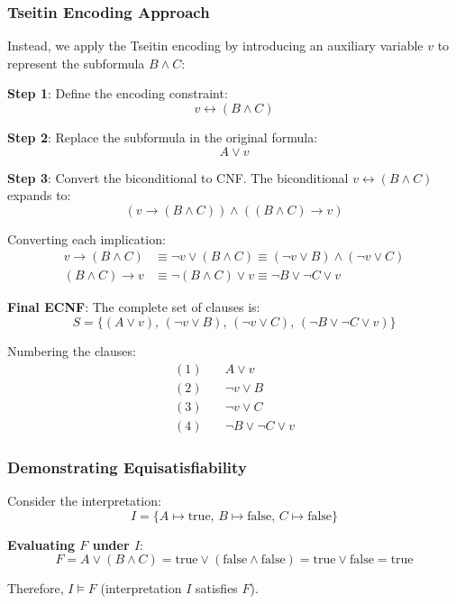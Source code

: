 \documentclass[11pt,a4paper]{article}
\theoremstyle{definition}
\theoremstyle{plain}
\theoremstyle{remark}
\begin{document}
\subsubsection{Tseitin Encoding Approach}

Instead, we apply the Tseitin encoding by introducing an auxiliary variable $v$ to represent the subformula $B \land C$:

\textbf{Step 1}: Define the encoding constraint:
\[
v \leftrightarrow (B \land C)
\]

\textbf{Step 2}: Replace the subformula in the original formula:
\[
A \lor v
\]

\textbf{Step 3}: Convert the biconditional to CNF. The biconditional $v \leftrightarrow (B \land C)$ expands to:
\[
(v \rightarrow (B \land C)) \land ((B \land C) \rightarrow v)
\]

Converting each implication:
\begin{align*}
v \rightarrow (B \land C) &\equiv \neg v \lor (B \land C) \equiv (\neg v \lor B) \land (\neg v \lor C) \\
(B \land C) \rightarrow v &\equiv \neg(B \land C) \lor v \equiv \neg B \lor \neg C \lor v
\end{align*}

\textbf{Final ECNF}: The complete set of clauses is:
\[
S = \{(A \lor v), \, (\neg v \lor B), \, (\neg v \lor C), \, (\neg B \lor \neg C \lor v)\}
\]

Numbering the clauses:
\begin{align*}
(1) &\quad A \lor v \\
(2) &\quad \neg v \lor B \\
(3) &\quad \neg v \lor C \\
(4) &\quad \neg B \lor \neg C \lor v
\end{align*}

\subsubsection{Demonstrating Equisatisfiability}

Consider the interpretation:
\[
I = \{A \mapsto \text{true}, \, B \mapsto \text{false}, \, C \mapsto \text{false}\}
\]

\textbf{Evaluating $F$ under $I$}:
\[
F = A \lor (B \land C) = \text{true} \lor (\text{false} \land \text{false}) = \text{true} \lor \text{false} = \text{true}
\]

Therefore, $I \models F$ (interpretation $I$ satisfies $F$).
\end{document}
